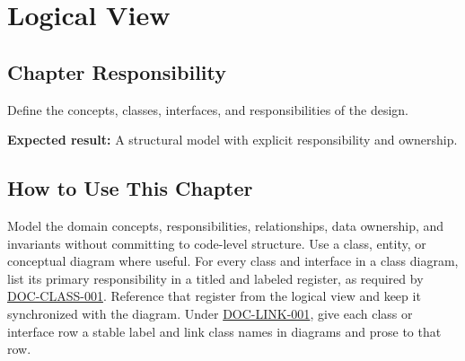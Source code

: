 \chapter{Logical View}
\section{Chapter Responsibility}
\label{Section:LogicalViewResponsibility}
Define the concepts, classes, interfaces, and responsibilities of the design.

\noindent\textbf{Expected result:} A structural model with explicit responsibility and ownership.

\section{How to Use This Chapter}
Model the domain concepts, responsibilities, relationships, data ownership, and invariants without committing to code-level structure. Use a class, entity, or conceptual diagram where useful. For every class and interface in a class diagram, list its primary responsibility in a titled and labeled register, as required by \hyperref[Requirement:DOCCLASS001]{DOC-CLASS-001}. Reference that register from the logical view and keep it synchronized with the diagram. Under \hyperref[Requirement:DOCLINK001]{DOC-LINK-001}, give each class or interface row a stable label and link class names in diagrams and prose to that row.
